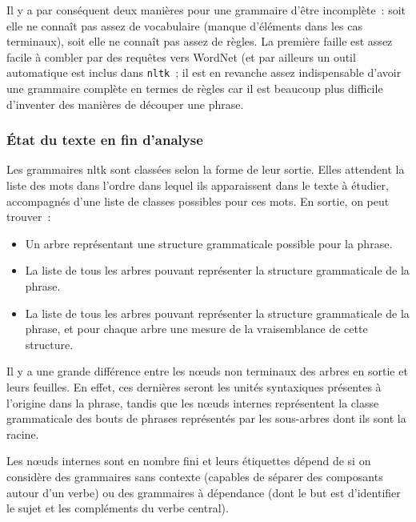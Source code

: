 \documentclass[a4paper,12pt]{article}
\newcommand{\pyt}[1]{\texttt{#1}}
\begin{document}
Il y a par conséquent deux manières pour une grammaire d'être incomplète~: soit elle ne connaît pas assez de vocabulaire (manque d'éléments dans les cas terminaux), soit elle ne connaît pas assez de règles. La première faille est assez facile à combler par des requêtes vers WordNet (et par ailleurs un outil automatique est inclus dans \pyt{nltk}~; il est en revanche assez indispensable d'avoir une grammaire complète en termes de règles car il est beaucoup plus difficile d'inventer des manières de découper une phrase.

\subsubsection{\'Etat du texte en fin d'analyse}
Les grammaires nltk sont classées selon la forme de leur sortie. Elles attendent la liste des mots dans l'ordre dans lequel ils apparaissent dans le texte à étudier, accompagnés d'une liste de classes possibles pour ces mots. En sortie, on peut trouver~:

\begin{itemize}
	\item Un arbre représentant une structure grammaticale possible pour la phrase.
	\item La liste de tous les arbres pouvant représenter la structure grammaticale de la phrase.
	\item La liste de tous les arbres pouvant représenter la structure grammaticale de la phrase, et pour chaque arbre une mesure de la vraisemblance de cette structure.
\end{itemize} 

Il y a une grande différence entre les n\oe{}uds non terminaux des arbres en sortie et leurs feuilles. En effet, ces dernières seront les unités syntaxiques présentes à l'origine dans la phrase, tandis que les n\oe{}uds internes représentent la classe grammaticale des bouts de phrases représentés par les sous-arbres dont ils sont la racine.


Les n\oe{}uds internes sont en nombre fini et leurs étiquettes dépend de si on considère des grammaires sans contexte (capables de séparer des composants autour d'un verbe) ou des grammaires à dépendance (dont le but est d'identifier le sujet et les compléments du verbe central).
\end{document}
